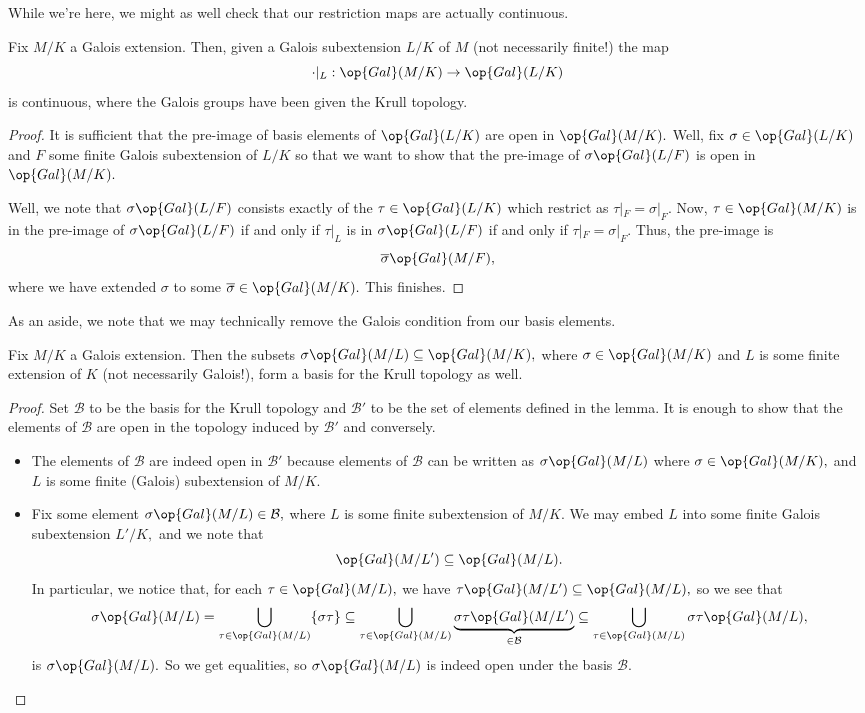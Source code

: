 \documentclass[../notes.tex]{subfiles}
\begin{document}
While we're here, we might as well check that our restriction maps are actually continuous.
\begin{prop}
	Fix $M/K$ a Galois extension. Then, given a Galois {sub}extension $L/K$ of $M$ (not necessarily finite!) the map
	\[\cdot|_L:\op{Gal}(M/K)\to\op{Gal}(L/K)\]
	is continuous, where the Galois groups have been given the Krull topology.
\end{prop}
\begin{proof}
	It is sufficient that the pre-image of basis elements of $\op{Gal}(L/K)$ are open in $\op{Gal}(M/K).$ Well, fix $\sigma\in\op{Gal}(L/K)$ and $F$ some finite Galois subextension of $L/K$ so that we want to show that the pre-image of $\sigma\op{Gal}(L/F)$ is open in $\op{Gal}(M/K).$

	Well, we note that $\sigma\op{Gal}(L/F)$ consists exactly of the $\tau\in\op{Gal}(L/K)$ which restrict as $\tau|_F=\sigma|_F.$ Now, $\tau\in\op{Gal}(M/K)$ is in the pre-image of $\sigma\op{Gal}(L/F)$ if and only if $\tau|_L$ is in $\sigma\op{Gal}(L/F)$ if and only if $\tau|_F=\sigma|_F.$ Thus, the pre-image is
	\[\overline\sigma\op{Gal}(M/F),\]
	where we have extended $\sigma$ to some $\overline\sigma\in\op{Gal}(M/K).$ This finishes.
\end{proof}
As an aside, we note that we may technically remove the Galois condition from our basis elements.
\begin{lemma}
	Fix $M/K$ a Galois extension. Then the subsets $\sigma\op{Gal}(M/L)\subseteq\op{Gal}(M/K),$ where $\sigma\in\op{Gal}(M/K)$ and $L$ is some finite extension of $K$ (not necessarily Galois!), form a basis for the Krull topology as well.
\end{lemma}
\begin{proof}
	Set $\mathcal B$ to be the basis for the Krull topology and $\mathcal B'$ to be the set of elements defined in the lemma. It is enough to show that the elements of $\mathcal B$ are open in the topology induced by $\mathcal B'$ and conversely.
	\begin{itemize}
		\item The elements of $\mathcal B$ are indeed open in $\mathcal B'$ because elements of $\mathcal B$ can be written as $\sigma\op{Gal}(M/L)$ where $\sigma\in\op{Gal}(M/K),$ and $L$ is some finite (Galois) sub{extension} of $M/K.$
		\item Fix some element $\sigma\op{Gal}(M/L)\in\mathcal B,$ where $L$ is some finite sub{extension} of $M/K.$ We may embed $L$ into some finite Galois sub{extension} $L'/K,$ and we note that
		\[\op{Gal}(M/L')\subseteq\op{Gal}(M/L).\]
		In particular, we notice that, for each $\tau\in\op{Gal}(M/L),$ we have $\tau\op{Gal}(M/L')\subseteq\op{Gal}(M/L),$ so we see that
		\[\sigma\op{Gal}(M/L)=\bigcup_{\tau\in\op{Gal}(M/L)}\{\sigma\tau\}\subseteq\bigcup_{\tau\in\op{Gal}(M/L)}\underbrace{\sigma\tau\op{Gal}(M/L')}_{\in\mathcal B}\subseteq\bigcup_{\tau\in\op{Gal}(M/L)}\sigma\tau\op{Gal}(M/L),\]
		is $\sigma\op{Gal}(M/L).$ So we get equalities, so $\sigma\op{Gal}(M/L)$ is indeed open under the basis $\mathcal B.$
		\qedhere
	\end{itemize}
\end{proof}
\end{document}
